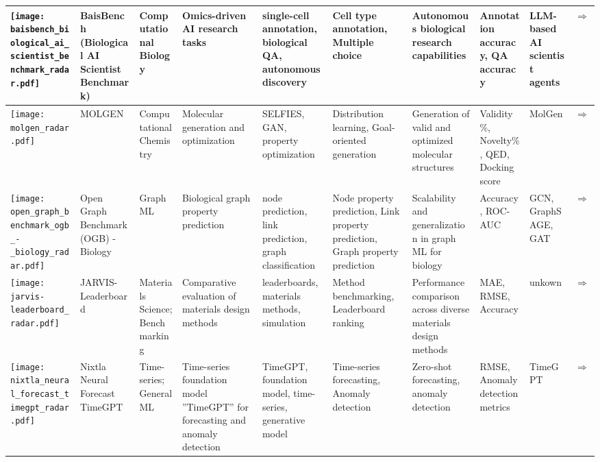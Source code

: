 \begin{landscape}
{\begin{longtable}{|p{}|p{}|p{}|p{}|p{}|p{}|p{}|p{}|p{}|p{}|}
\texttt{[image: baisbench\_biological\_ai\_scientist\_benchmark\_radar.pdf]} & BaisBench (Biological AI Scientist Benchmark) & Computational Biology & Omics-driven AI research tasks & single-cell annotation, biological QA, autonomous discovery & Cell type annotation, Multiple choice & Autonomous biological research capabilities & Annotation accuracy, QA accuracy & LLM-based AI scientist agents & \cite{luo2025benchmarkingaiscientistsomics}\href{https://arxiv.org/abs/2505.08341}{$\Rightarrow$} \\ \hline
\texttt{[image: molgen\_radar.pdf]} & MOLGEN & Computational Chemistry & Molecular generation and optimization & SELFIES, GAN, property optimization & Distribution learning, Goal-oriented generation & Generation of valid and optimized molecular structures & Validity\%, Novelty\%, QED, Docking score & MolGen & \cite{fang2024domainagnosticmoleculargenerationchemical}\href{https://github.com/zjunlp/MolGen}{$\Rightarrow$} \\ \hline
\texttt{[image: open\_graph\_benchmark\_ogb\_-\_biology\_radar.pdf]} & Open Graph Benchmark (OGB) - Biology & Graph ML & Biological graph property prediction & node prediction, link prediction, graph classification & Node property prediction, Link property prediction, Graph property prediction & Scalability and generalization in graph ML for biology & Accuracy, ROC-AUC & GCN, GraphSAGE, GAT & \cite{hu2021opengraphbenchmarkdatasets}\href{https://ogb.stanford.edu/docs/home/}{$\Rightarrow$} \\ \hline
\texttt{[image: jarvis-leaderboard\_radar.pdf]} & JARVIS-Leaderboard & Materials Science; Benchmarking & Comparative evaluation of materials design methods & leaderboards, materials methods, simulation & Method benchmarking, Leaderboard ranking & Performance comparison across diverse materials design methods & MAE, RMSE, Accuracy & unkown & \cite{choudhary2024jarvis}\href{https://arxiv.org/abs/2306.11688}{$\Rightarrow$} \\ \hline
\texttt{[image: nixtla\_neural\_forecast\_timegpt\_radar.pdf]} & Nixtla Neural Forecast TimeGPT & Time-series; General ML & Time-series foundation model ''TimeGPT'' for forecasting and anomaly detection & TimeGPT, foundation model, time-series, generative model & Time-series forecasting, Anomaly detection & Zero-shot forecasting, anomaly detection & RMSE, Anomaly detection metrics & TimeGPT & \cite{garza2024timegpt1}\href{https://github.com/Nixtla/neuralforecast}{$\Rightarrow$} \\ \hline

\end{longtable}}
\end{landscape}
